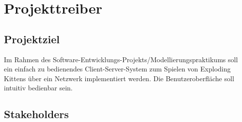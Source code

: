 \chapter{Projekttreiber}

\section{Projektziel}

Im Rahmen des Software-Entwicklungs-Projekts/Modellierungspraktikums {\the\year} soll ein einfach zu bedienendes Client-Server-System zum Spielen von Exploding Kittens über ein Netzwerk implementiert werden. Die Benutzeroberfläche soll intuitiv bedienbar sein.

\section{Stakeholders}

\setcounter{sh}{10}

